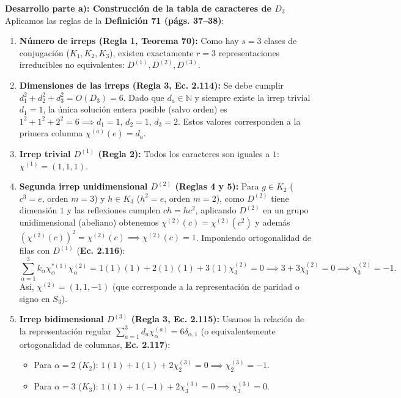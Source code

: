 \documentclass[11pt, a4paper]{article}
\begin{document}
\noindent \textbf{Desarrollo parte a): Construcción de la tabla de caracteres de $D_3$}
Aplicamos las reglas de la \textbf{Definición 71 (págs. 37--38)}:
\begin{enumerate}[label=\arabic*.]
    \item \textbf{Número de irreps (Regla 1, Teorema 70):} Como hay $s = 3$ clases de conjugación ($K_1, K_2, K_3$), existen exactamente $r = 3$ representaciones irreducibles no equivalentes: $D^{(1)}, D^{(2)}, D^{(3)}$.
    \item \textbf{Dimensiones de las irreps (Regla 3, Ec. 2.114):} Se debe cumplir $d_1^2 + d_2^2 + d_3^2 = O(D_3) = 6$. Dado que $d_a \in \mathbb{N}$ y siempre existe la irrep trivial $d_1 = 1$, la única solución entera posible (salvo orden) es $1^2 + 1^2 + 2^2 = 6 \implies d_1 = 1, \, d_2 = 1, \, d_3 = 2$. Estos valores corresponden a la primera columna $\chi^{(a)}(e) = d_a$.
    \item \textbf{Irrep trivial $D^{(1)}$ (Regla 2):} Todos los caracteres son iguales a $1$: $\chi^{(1)} = (1, 1, 1)$.
    \item \textbf{Segunda irrep unidimensional $D^{(2)}$ (Reglas 4 y 5):} Para $g \in K_2$ ($c^3 = e$, orden $m=3$) y $h \in K_3$ ($h^2 = e$, orden $m=2$), como $D^{(2)}$ tiene dimensión $1$ y las reflexiones cumplen $c h = h c^2$, aplicando $D^{(2)}$ en un grupo unidimensional (abeliano) obtenemos $\chi^{(2)}(c) = \chi^{(2)}(c^2)$ y además $(\chi^{(2)}(c))^2 = \chi^{(2)}(c) \implies \chi^{(2)}(c) = 1$. Imponiendo ortogonalidad de filas con $D^{(1)}$ (\textbf{Ec. 2.116}):
    \[
    \sum_{\alpha=1}^3 k_\alpha \chi_\alpha^{*(1)} \chi_\alpha^{(2)} = 1(1)(1) + 2(1)(1) + 3(1)\chi_3^{(2)} = 0 \implies 3 + 3\chi_3^{(2)} = 0 \implies \chi_3^{(2)} = -1.
    \]
    Así, $\chi^{(2)} = (1, 1, -1)$ (que corresponde a la representación de paridad o signo en $S_3$).
    \item \textbf{Irrep bidimensional $D^{(3)}$ (Regla 3, Ec. 2.115):} Usamos la relación de la representación regular $\sum_{a=1}^3 d_a \chi_\alpha^{(a)} = 6 \delta_{\alpha, 1}$ (o equivalentemente ortogonalidad de columnas, \textbf{Ec. 2.117}):
    \begin{itemize}
        \item Para $\alpha = 2$ ($K_2$): $1(1) + 1(1) + 2\chi_2^{(3)} = 0 \implies \chi_2^{(3)} = -1$.
        \item Para $\alpha = 3$ ($K_3$): $1(1) + 1(-1) + 2\chi_3^{(3)} = 0 \implies \chi_3^{(3)} = 0$.
    \end{itemize}
\end{enumerate}
\end{document}
